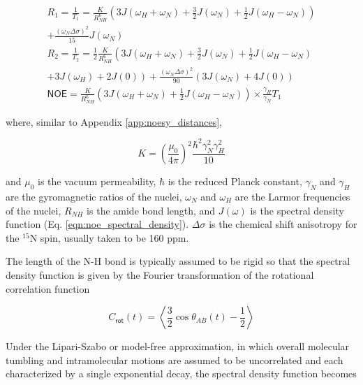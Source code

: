 \documentclass[9pt,review]{livecoms}
\begin{document}
\begin{equation}
\label{eqn:redfield}
\begin{gathered}
R_1 = \frac {1} {T_1} = \frac {K} {R_{NH}^6} \left( 3 J(\omega_H + \omega_N) + \frac {3} {2} J(\omega_N) + \frac {1} {2} J(\omega_H - \omega_N) \right) \\
+ \frac {\left( \omega_N \Delta \sigma \right)^2} {15} J(\omega_N) \\
R_2 = \frac {1} {T_2} = \frac {1} {2} \frac {K} {R_{NH}^6} \left( 3 J(\omega_H + \omega_N) + \frac {3} {2} J(\omega_N) + \frac {1} {2} J(\omega_H - \omega_N) \right. \\
\left. + 3 J(\omega_H) + 2 J(0) \right) + \frac {\left( \omega_N \Delta \sigma \right)^2} {90} \left( 3 J(\omega_N) + 4 J(0) \right) \\
\mathsf{NOE} = \frac {K} {R_{NH}^6} \left( 3 J(\omega_H + \omega_N) + \frac {1} {2} J(\omega_H - \omega_N) \right) \times \frac {\gamma_H} {\gamma_N} T_1
\end{gathered}
\end{equation}

\noindent where, similar to Appendix \ref{app:noesy_distances},

\begin{equation}
\label{eqn:spin_relaxation_constant}
K = \left( \frac {\mu_0} {4 \pi} \right)^2 \frac {\hbar^2 \gamma_N^2 \gamma_H^2} {10}
\end{equation}

\noindent and $\mu_0$ is the vacuum permeability, $\hbar$ is the reduced Planck constant, $\gamma_N$ and $\gamma_H$ are the gyromagnetic ratios of the nuclei, $\omega_N$ and $\omega_H$ are the Larmor frequencies of the nuclei, $R_{NH}$ is the amide bond length, and $J(\omega)$ is the spectral density function (Eq. \ref{eqn:noe_spectral_density}).
$\Delta \sigma$ is the chemical shift anisotropy for the $^{15}$N spin, usually taken to be 160 ppm.

The length of the N-H bond is typically assumed to be rigid so that the spectral density function is given by the Fourier transformation of the rotational correlation function

\begin{equation}
\label{eqn:spin_relaxation_correlation_function}
C_{\mathsf{rot}}(t) = \left \langle \frac {3} {2} \cos \theta_{AB}(t) - \frac {1} {2} \right \rangle
\end{equation}

Under the Lipari-Szabo or model-free approximation, in which overall molecular tumbling and intramolecular motions are assumed to be uncorrelated and each characterized by a single exponential decay, the spectral density function becomes
\end{document}
